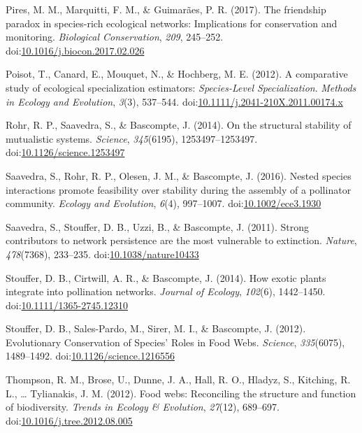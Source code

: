 \documentclass[a4paper]{artikel1}
\theoremstyle{definition}
\theoremstyle{definition}
\theoremstyle{definition}
\theoremstyle{remark}
\begin{document}
\hypertarget{ref-pires_friendship_2017}{}
Pires, M. M., Marquitti, F. M., \& Guimarães, P. R. (2017). The
friendship paradox in species-rich ecological networks: Implications for
conservation and monitoring. \emph{Biological Conservation}, \emph{209},
245--252.
doi:\href{https://doi.org/10.1016/j.biocon.2017.02.026}{10.1016/j.biocon.2017.02.026}

\hypertarget{ref-poisot_comparative_2012}{}
Poisot, T., Canard, E., Mouquet, N., \& Hochberg, M. E. (2012). A
comparative study of ecological specialization estimators:
\emph{Species}\emph{-Level Specialization}. \emph{Methods in Ecology and
Evolution}, \emph{3}(3), 537--544.
doi:\href{https://doi.org/10.1111/j.2041-210X.2011.00174.x}{10.1111/j.2041-210X.2011.00174.x}

\hypertarget{ref-rohr_structural_2014}{}
Rohr, R. P., Saavedra, S., \& Bascompte, J. (2014). On the structural
stability of mutualistic systems. \emph{Science}, \emph{345}(6195),
1253497--1253497.
doi:\href{https://doi.org/10.1126/science.1253497}{10.1126/science.1253497}

\hypertarget{ref-saavedra_nested_2016}{}
Saavedra, S., Rohr, R. P., Olesen, J. M., \& Bascompte, J. (2016).
Nested species interactions promote feasibility over stability during
the assembly of a pollinator community. \emph{Ecology and Evolution},
\emph{6}(4), 997--1007.
doi:\href{https://doi.org/10.1002/ece3.1930}{10.1002/ece3.1930}

\hypertarget{ref-saavedra_strong_2011}{}
Saavedra, S., Stouffer, D. B., Uzzi, B., \& Bascompte, J. (2011). Strong
contributors to network persistence are the most vulnerable to
extinction. \emph{Nature}, \emph{478}(7368), 233--235.
doi:\href{https://doi.org/10.1038/nature10433}{10.1038/nature10433}

\hypertarget{ref-stouffer_how_2014}{}
Stouffer, D. B., Cirtwill, A. R., \& Bascompte, J. (2014). How exotic
plants integrate into pollination networks. \emph{Journal of Ecology},
\emph{102}(6), 1442--1450.
doi:\href{https://doi.org/10.1111/1365-2745.12310}{10.1111/1365-2745.12310}

\hypertarget{ref-stouffer_evolutionary_2012}{}
Stouffer, D. B., Sales-Pardo, M., Sirer, M. I., \& Bascompte, J. (2012).
Evolutionary Conservation of Species' Roles in Food Webs.
\emph{Science}, \emph{335}(6075), 1489--1492.
doi:\href{https://doi.org/10.1126/science.1216556}{10.1126/science.1216556}

\hypertarget{ref-thompson_food_2012}{}
Thompson, R. M., Brose, U., Dunne, J. A., Hall, R. O., Hladyz, S.,
Kitching, R. L., \ldots{} Tylianakis, J. M. (2012). Food webs:
Reconciling the structure and function of biodiversity. \emph{Trends in
Ecology \& Evolution}, \emph{27}(12), 689--697.
doi:\href{https://doi.org/10.1016/j.tree.2012.08.005}{10.1016/j.tree.2012.08.005}
\end{document}
